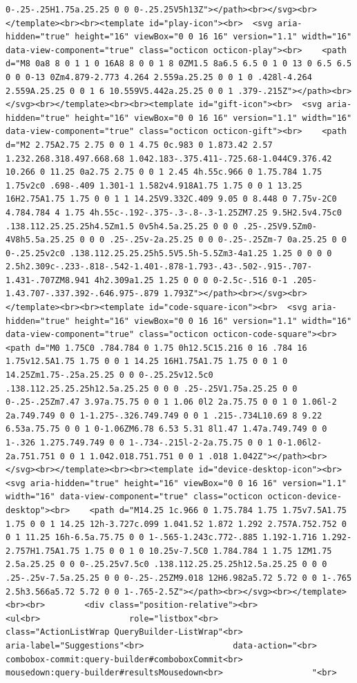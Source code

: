 \documentclass[
  letterpaper,
]{book}
\begin{document}
\begin{verbatim}
0-.25-.25H1.75a.25.25 0 0 0-.25.25V5h13Z"></path><br></svg><br></template><br><br><template id="play-icon"><br>  <svg aria-hidden="true" height="16" viewBox="0 0 16 16" version="1.1" width="16" data-view-component="true" class="octicon octicon-play"><br>    <path d="M8 0a8 8 0 1 1 0 16A8 8 0 0 1 8 0ZM1.5 8a6.5 6.5 0 1 0 13 0 6.5 6.5 0 0 0-13 0Zm4.879-2.773 4.264 2.559a.25.25 0 0 1 0 .428l-4.264 2.559A.25.25 0 0 1 6 10.559V5.442a.25.25 0 0 1 .379-.215Z"></path><br></svg><br></template><br><br><template id="gift-icon"><br>  <svg aria-hidden="true" height="16" viewBox="0 0 16 16" version="1.1" width="16" data-view-component="true" class="octicon octicon-gift"><br>    <path d="M2 2.75A2.75 2.75 0 0 1 4.75 0c.983 0 1.873.42 2.57 1.232.268.318.497.668.68 1.042.183-.375.411-.725.68-1.044C9.376.42 10.266 0 11.25 0a2.75 2.75 0 0 1 2.45 4h.55c.966 0 1.75.784 1.75 1.75v2c0 .698-.409 1.301-1 1.582v4.918A1.75 1.75 0 0 1 13.25 16H2.75A1.75 1.75 0 0 1 1 14.25V9.332C.409 9.05 0 8.448 0 7.75v-2C0 4.784.784 4 1.75 4h.55c-.192-.375-.3-.8-.3-1.25ZM7.25 9.5H2.5v4.75c0 .138.112.25.25.25h4.5Zm1.5 0v5h4.5a.25.25 0 0 0 .25-.25V9.5Zm0-4V8h5.5a.25.25 0 0 0 .25-.25v-2a.25.25 0 0 0-.25-.25Zm-7 0a.25.25 0 0 0-.25.25v2c0 .138.112.25.25.25h5.5V5.5h-5.5Zm3-4a1.25 1.25 0 0 0 0 2.5h2.309c-.233-.818-.542-1.401-.878-1.793-.43-.502-.915-.707-1.431-.707ZM8.941 4h2.309a1.25 1.25 0 0 0 0-2.5c-.516 0-1 .205-1.43.707-.337.392-.646.975-.879 1.793Z"></path><br></svg><br></template><br><br><template id="code-square-icon"><br>  <svg aria-hidden="true" height="16" viewBox="0 0 16 16" version="1.1" width="16" data-view-component="true" class="octicon octicon-code-square"><br>    <path d="M0 1.75C0 .784.784 0 1.75 0h12.5C15.216 0 16 .784 16 1.75v12.5A1.75 1.75 0 0 1 14.25 16H1.75A1.75 1.75 0 0 1 0 14.25Zm1.75-.25a.25.25 0 0 0-.25.25v12.5c0 .138.112.25.25.25h12.5a.25.25 0 0 0 .25-.25V1.75a.25.25 0 0 0-.25-.25Zm7.47 3.97a.75.75 0 0 1 1.06 0l2 2a.75.75 0 0 1 0 1.06l-2 2a.749.749 0 0 1-1.275-.326.749.749 0 0 1 .215-.734L10.69 8 9.22 6.53a.75.75 0 0 1 0-1.06ZM6.78 6.53 5.31 8l1.47 1.47a.749.749 0 0 1-.326 1.275.749.749 0 0 1-.734-.215l-2-2a.75.75 0 0 1 0-1.06l2-2a.751.751 0 0 1 1.042.018.751.751 0 0 1 .018 1.042Z"></path><br></svg><br></template><br><br><template id="device-desktop-icon"><br>  <svg aria-hidden="true" height="16" viewBox="0 0 16 16" version="1.1" width="16" data-view-component="true" class="octicon octicon-device-desktop"><br>    <path d="M14.25 1c.966 0 1.75.784 1.75 1.75v7.5A1.75 1.75 0 0 1 14.25 12h-3.727c.099 1.041.52 1.872 1.292 2.757A.752.752 0 0 1 11.25 16h-6.5a.75.75 0 0 1-.565-1.243c.772-.885 1.192-1.716 1.292-2.757H1.75A1.75 1.75 0 0 1 0 10.25v-7.5C0 1.784.784 1 1.75 1ZM1.75 2.5a.25.25 0 0 0-.25.25v7.5c0 .138.112.25.25.25h12.5a.25.25 0 0 0 .25-.25v-7.5a.25.25 0 0 0-.25-.25ZM9.018 12H6.982a5.72 5.72 0 0 1-.765 2.5h3.566a5.72 5.72 0 0 1-.765-2.5Z"></path><br></svg><br></template><br><br>        <div class="position-relative"><br>                <ul<br>                  role="listbox"<br>                  class="ActionListWrap QueryBuilder-ListWrap"<br>                  aria-label="Suggestions"<br>                  data-action="<br>                    combobox-commit:query-builder#comboboxCommit<br>                    mousedown:query-builder#resultsMousedown<br>                  "<br>      
\end{verbatim}
\end{document}
